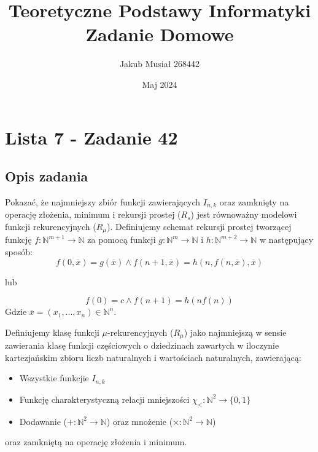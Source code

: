 \documentclass[12pt]{article}
\title{Teoretyczne Podstawy Informatyki \newline Zadanie Domowe}
\author{Jakub Musiał 268442}
\date{Maj 2024}
\begin{document}
\maketitle

\hspace{1cm}

\section*{Lista 7 - Zadanie 42}

\subsection*{Opis zadania}
    Pokazać, że najmniejszy zbiór funkcji zawierających $I_{n,k}$ oraz zamknięty na operację złożenia, minimum i rekursji prostej ($R_s$) jest równoważny modelowi funkcji rekurencyjnych ($R_\mu$).
    \newline\newline
    \noindent Definiujemy schemat rekursji prostej tworzącej funkcję $f:\mathbb{N}^{m + 1} \rightarrow \mathbb{N}$ za pomocą funkcji $g:\mathbb{N}^{m} \rightarrow \mathbb{N}$ i $h:\mathbb{N}^{m + 2} \rightarrow \mathbb{N}$ w następujący sposób:
    $$
    f(0, \overline{x}) = g(\overline{x}) \land f(n + 1, \overline{x}) = h(n, f(n, \overline{x}), \overline{x})
    $$
    \begin{center}
        lub
    \end{center}
    $$
    f(0) = c \land f(n + 1) = h(n f(n))
    $$
    \noindent Gdzie $\overline{x} = (x_1, ..., x_n) \in \mathbb{N}^n$.

    \noindent \newline

    \noindent Definiujemy klasę funkcji $\mu$-rekurencyjnych ($R_\mu$) jako najmniejszą w sensie zawierania klasę funkcji częściowych o dziedzinach zawartych w iloczynie kartezjańskim zbioru liczb naturalnych i wartościach naturalnych, zawierającą:
    \begin{itemize}
        \item Wszystkie funkcjie $I_{n,k}$
        \item Funkcję charakterystyczną relacji mniejszości $\chi_< : \mathbb{N}^2 \rightarrow \{0, 1\}$
        \item Dodawanie ($+ : \mathbb{N}^2 \rightarrow \mathbb{N}$) oraz mnożenie ($\times : \mathbb{N}^2 \rightarrow \mathbb{N}$)
    \end{itemize}
    oraz zamkniętą na operację złożenia i minimum.
\end{document}
